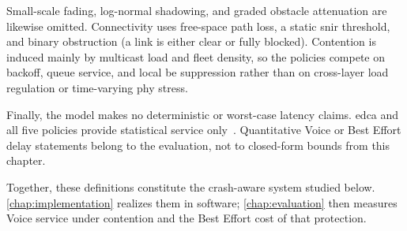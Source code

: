 Small-scale fading, log-normal shadowing, and graded obstacle attenuation are likewise omitted.
Connectivity uses free-space path loss, a static \gls{snir} threshold, and binary obstruction (a link is either clear or fully blocked).
Contention is induced mainly by multicast load and fleet density, so the policies compete on backoff, queue service, and local \gls{be} suppression rather than on cross-layer load regulation or time-varying \gls{phy} stress.

Finally, the model makes no deterministic or worst-case latency claims.
\gls{edca} and all five policies provide statistical service only~\cite{kosekszott2012What,mangold2003QoS}.
Quantitative Voice or Best Effort delay statements belong to the evaluation, not to closed-form bounds from this chapter.

Together, these definitions constitute the crash-aware system studied below.
\autoref{chap:implementation} realizes them in software; \autoref{chap:evaluation} then measures Voice service under contention and the Best Effort cost of that protection.
